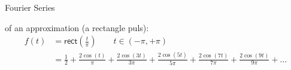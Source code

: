 \begin{frame}[t]{Fourier Series}

    \myExample of an approximation (a rectangle puls):
    {\scriptsize
    \begin{align*}
        f(t) & = \mathsf{rect}\left( \frac{t}{\pi} \right) \quad\quad t \in \left(-\pi,+\pi\right)                                                                 \\
             & = \frac{1}{2} + \frac{2\cos(t)}{\pi} + \frac{2\cos(3t)}{3\pi} + \frac{2\cos(5t)}{5\pi} +  \frac{2\cos(7t)}{7\pi} +  \frac{2\cos(9t)}{9\pi} + \ldots
    \end{align*}}%
    \vspace{-0.4cm}
    \begin{center}
\end{center}
\end{frame}
